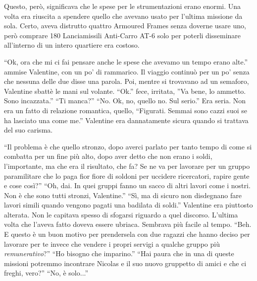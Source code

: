     Questo, però, significava che le spese per le strumentazioni erano enormi. Una volta era riuscita a spendere quello
    che avevano usato per l'ultima missione da sola. Certo, aveva distrutto quattro Armoured Frames senza doverne usare uno,
    però comprare 180 Lanciamissili Anti-Carro AT-6 solo per poterli disseminare all'interno di un intero quartiere era
    costoso.

    ``Ok, ora che mi ci fai pensare anche le spese che avevamo un tempo erano alte.'' ammise Valentine, con un po' di
    rammarico. Il viaggio continuò per un po' senza che nessuna delle due disse una parola. Poi, mentre si trovavano ad
    un semaforo, Valentine sbattè le mani sul volante. ``Ok.'' fece, irritata, ''Va bene, lo ammetto. Sono incazzata.''
    ``Ti manca?'' ``No. Ok, no, quello no. Sul serio.'' Era seria. Non era un fatto di relazione romantica, quello,
    ``Figurati. Semmai sono cazzi suoi se ha lasciato una come me.'' Valentine era dannatamente sicura quando si
    trattava del suo carisma.

    ``Il problema è che quello stronzo, dopo averci parlato per tanto tempo di come si combatta per un fine più alto,
    dopo aver detto che non erano i soldi, l'importante, ma che era il risultato, che fa? Se ne va per lavorare per un
    gruppo paramilitare che lo paga fior fiore di soldoni per uccidere ricercatori, rapire gente e cose così?'' ``Oh,
    dai. In quei gruppi fanno un sacco di altri lavori come i nostri. Non è che sono tutti stronzi, Valentine.'' ``Sì,
    ma di sicuro non disdegnano fare lavori simili quando vengono pagati una badilata di soldi.'' Valentine era
    piuttosto alterata. Non le capitava spesso di sfogarsi riguardo a quel discorso. L'ultima volta che l'aveva fatto
    doveva essere ubriaca. Sembrava più facile al tempo. ``Beh. E questo è un buon motivo per prendersela con due
    ragazzi che hanno deciso per lavorare per te invece che vendere i propri servigi a qualche gruppo più
    \emph{remunerativo}?'' ``Ho bisogno che imparino.'' ``Hai paura che in una di queste missioni potremmo incontrare
    Nicolas e il suo nuovo gruppetto di amici e che ci freghi, vero?'' ``No, è solo...''

